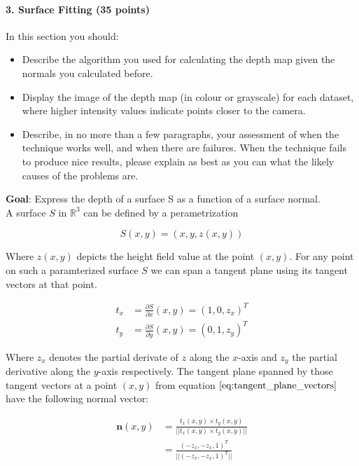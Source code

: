 \documentclass{paper}
\begin{document}
\paragraph{3. Surface Fitting (35 points)}

In this section you should: 

\begin{itemize}
\item Describe the algorithm you used for calculating the depth map given the normals you calculated before.
\item Display the image of the depth map (in colour or grayscale) for each dataset, where higher intensity values indicate points closer to the camera.
\item Describe, in no more than a few paragraphs, your assessment of when the technique works well, and when there are failures. When the technique fails to produce nice results, please explain as best as you can what the likely causes of the problems are.
\end{itemize}


\textbf{Goal}: Express the depth of a surface S as a function of a surface normal. \\
A surface $S$ in $\mathbb{R}^3$ can be defined by a perametrization 

\begin{equation}
    S(x,y) = (x,y,z(x,y))
\end{equation}

Where $z(x,y)$ depicts the height field value at the point $(x,y)$. For any point on such a paramterized surface $S$ we can span a tangent plane using its tangent vectors at that point.

\begin{align}
    t_x &= \frac{\partial S}{\partial x}(x,y) = (1,0,z_x)^T \nonumber \\
    t_y &= \frac{\partial S}{\partial y}(x,y) = (0,1,z_y)^T
\label{eq:tangent_plane_vectors}
\end{align}

Where $z_x$ denotes the partial derivate of $z$ along the $x$-axis and $z_y$ the partial derivative along the $y$-axis respectively. The tangent plane spanned by those tangent vectors at a point $(x,y)$ from equation $\ref{eq:tangent_plane_vectors}$ have the following normal vector:

\begin{align}
    \textbf{n}(x,y) &= \frac{t_x(x,y) \times t_y(x,y)}{|| t_x(x,y) \times t_y(x,y)||}\nonumber \\
     &= \frac{(-z_x, -z_x, 1)^T}{||(-z_x, -z_x, 1)^T||}
\label{eq:tan_plane_normal}
\end{align}
\end{document}
